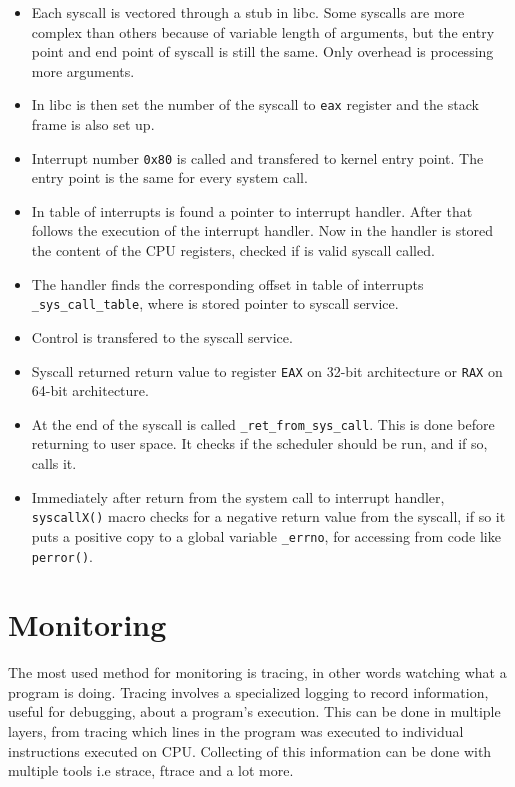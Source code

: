 \begin{itemize}
	\item Each syscall is vectored through a stub in libc. Some syscalls are more complex than others because of variable length of arguments, but the entry point and end point of syscall is still the same. Only overhead is processing more arguments.
	\item In libc is then set the number of the syscall to \texttt{eax} register and the stack frame is also set up.
	\item Interrupt number \texttt{0x80} is called and transfered to kernel entry point. The entry point is the same for every system call.
	\item In table of interrupts is found a pointer to interrupt handler. After that follows the execution of the interrupt handler. Now in the handler is stored the content of the CPU registers, checked if is valid syscall called.
	\item The handler finds the corresponding offset in table of interrupts \texttt{\_sys\_call\_table}, where is stored pointer to syscall service.
	\item Control is transfered to the syscall service.
	\item Syscall returned return value to register \texttt{EAX} on 32-bit architecture or \texttt{RAX} on 64-bit architecture.
	\item At the end of the syscall is called \texttt{\_ret\_from\_sys\_call\(\)}. This is done before returning to user space. It checks if the scheduler should be run, and if so, calls it.
	\item Immediately after return from the system call to interrupt handler, \texttt{syscallX()} macro checks for a negative return value from the syscall, if so it puts a positive copy to a global variable \texttt{\_errno}, for accessing from code like \texttt{perror()}.
\end{itemize}

% 

\section{Monitoring}
The most used method for monitoring is tracing, in other words watching what a program is doing. Tracing involves a specialized logging to record information, useful for debugging, about a program's execution. This can be done in multiple layers, from tracing which lines in the program was executed to individual instructions executed on CPU. Collecting of this information can be done with multiple tools i.e strace, ftrace and a lot more.

